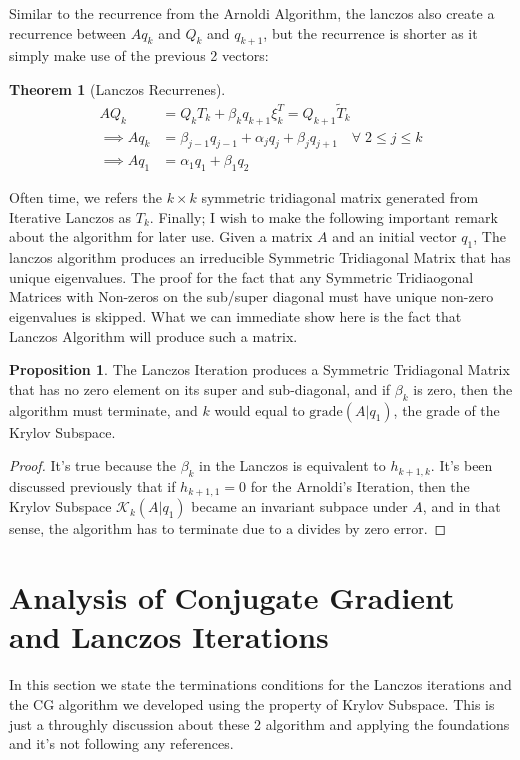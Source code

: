 \documentclass[]{article}
\theoremstyle{definition}
\newtheorem{theorem}{Theorem}            %
\newtheorem{prop}{Proposition}[section]  %
\begin{document}
            Similar to the recurrence from the Arnoldi Algorithm, the lanczos also create a recurrence between $Aq_k$ and $Q_k$ and $q_{k + 1}$, but the recurrence is shorter as it simply make use of the previous 2 vectors: 
            \begin{theorem}[Lanczos Recurrenes]
                \begin{align}
                    AQ_k &= Q_kT_k + \beta_k q_{k + 1}\xi_k^T = Q_{k + 1}\tilde{T}_k
                    \\
                    \implies Aq_k
                    &= \beta_{j - 1}q_{j - 1} + \alpha_j q_j + \beta_{j}q_{j + 1} \quad \forall\; 2\le j\le k
                    \\
                    \implies Aq_1 &= \alpha_1q_1 + \beta_1 q_2
                \end{align}    
            \end{theorem}
            
            \par
            Often time, we refers the $k\times k$ symmetric tridiagonal matrix generated from Iterative Lanczos as $T_k$. Finally; I wish to make the following important remark about the algorithm for later use. Given a matrix $A$ and an initial vector $q_1$, The lanczos algorithm produces an irreducible Symmetric Tridiagonal Matrix that has unique eigenvalues. The proof for the fact that any Symmetric Tridiaogonal Matrices with Non-zeros on the sub/super diagonal must have unique non-zero eigenvalues is skipped. What we can immediate show here is the fact that Lanczos Algorithm will produce such a matrix. 
            \begin{prop}
                The Lanczos Iteration produces a Symmetric Tridiagonal Matrix that has no zero element on its super and sub-diagonal, and if $\beta_k$ is zero, then the algorithm must terminate, and $k$ would equal to $\text{grade}(A|q_1)$, the grade of the Krylov Subspace. 
            \end{prop}
            \begin{proof}
                It's true because the $\beta_{k}$ in the Lanczos is equivalent to $h_{k + 1, k}$. It's been discussed previously that if $h_{k + 1, 1} = 0$ for the Arnoldi's Iteration, then the Krylov Subspace $\mathcal K_k(A|q_1)$ became an invariant subpace under $A$, and in that sense, the algorithm has to terminate due to a divides by zero error. 
            \end{proof}
\section{Analysis of Conjugate Gradient and Lanczos Iterations}
    In this section we state the terminations conditions for the Lanczos iterations and the CG algorithm we developed using the property of Krylov Subspace. This is just a throughly discussion about these 2 algorithm and applying the foundations and it's not following any references. 
\end{document}
